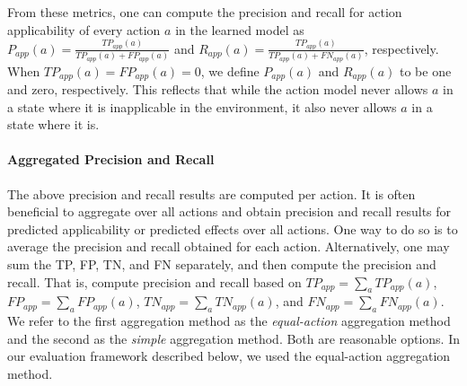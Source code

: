 \documentclass{article}
\theoremstyle{definition}
\theoremstyle{remark}
\newcommand{\app}{\ensuremath{\textit{app}}\xspace}
\newif\ifaddcomments
\newcommand{\roni}[1]{\ifaddcomments{\textcolor{red}{[Roni: #1]}}\fi}
\newcommand{\argaman}[1]{\ifaddcomments{\textcolor{blue}{[Argaman: #1]}}\fi}
\newcommand{\leo}[1]{\ifaddcomments{\textcolor{pink}{[Leonardo: #1]}}\fi}
\begin{document}
From these metrics, one can compute the precision and recall 
for action applicability
of every action $a$ in the learned model as 
$P_{\app}(a)= \frac{TP_{\app}(a)}{TP_{\app}(a)+FP_{\app}(a)}$ 
and $R_{\app}(a)= \frac{TP_{\app}(a)}{TP_{\app}(a)+FN_{\app}(a)}$, 
respectively. 
When $TP_{\app}(a)=FP_{\app}(a)=0$, we define $P_{\app}(a)$ and $R_{\app}(a)$ to be one and zero, respectively. This reflects that while the action model never allows $a$ in a state where it is inapplicable in the environment, it also never allows $a$ in a state where it is. 




\paragraph{Aggregated Precision and Recall}
The above precision and recall results are computed per action. It is often beneficial to aggregate over all actions and obtain precision and recall results for predicted applicability or predicted effects over all actions. 
One way to do so is to average the precision and recall obtained for each action. 
Alternatively, one may sum the 
TP, FP, TN, and FN separately, and then compute the precision and recall. 
That is, compute precision and recall based on $TP_\app=\sum_a TP_\app(a)$, 
$FP_\app=\sum_a FP_\app(a)$,
$TN_\app=\sum_a TN_\app(a)$, and
$FN_\app=\sum_a FN_\app(a)$. 
We refer to the first aggregation method as the \emph{equal-action} aggregation method and the second as the \emph{simple} aggregation method. 
Both are reasonable options. 
In our evaluation framework described below, we used the equal-action aggregation method. 
\leo{For syntactic precision the `simple` one, this is because e.g. if there are 2 actions with 1 and 10 precs/effs resp., then the precision averaged over the two actions weights 1 mistake in the first action differently from 1 mistake in the second one, I am not sure we want this. For the predictive power metrics we aggregated using the `equal-action` method, this is because the number of samples can be very unbalanced (e.g. 1 vs 100). I do not think there is a `right` one, so I stored both metrics during the experiments and we can choose}
\roni{In the syntactic metrics this is not an issue because we measure based on the model, not the states in the test set. }
\end{document}
